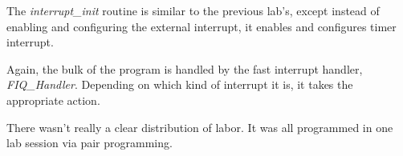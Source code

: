 \documentclass[letterpaper,10pt]{article}
\begin{document}
    \begin{minipage}{\linewidth}
        
        \label{flo:main}
    \end{minipage}

    The \textit{interrupt\_init} routine is similar to the previous lab's,
    except instead of enabling and configuring the external interrupt, it
    enables and configures timer interrupt.

    \begin{minipage}{\linewidth}
        
        \label{flo:interrupt_init}
    \end{minipage}

    Again, the bulk of the program is handled by the fast interrupt handler,
    \textit{FIQ\_Handler}. Depending on which kind of interrupt it is, it takes
    the appropriate action.

    

    \begin{minipage}{\linewidth}
        
        \label{flo:fiq_handler}
    \end{minipage}

    There wasn't really a clear distribution of labor. It was all programmed in
    one lab session via pair programming.
\end{document}
